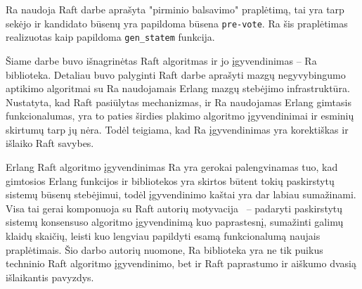 \documentclass{VUMIFPSkursinis}
\begin{document}
Ra  naudoja Raft darbe aprašyta "pirminio balsavimo" praplėtimą, tai yra tarp sekėjo ir kandidato būsenų yra papildoma būsena \texttt{pre-vote}. Ra šis praplėtimas realizuotas kaip papildoma \texttt{gen\_statem} funkcija.



Šiame darbe buvo išnagrinėtas Raft algoritmas ir jo įgyvendinimas -- Ra biblioteka. Detaliau buvo palyginti Raft darbe aprašyti mazgų negyvybingumo aptikimo algoritmai su Ra naudojamais Erlang mazgų stebėjimo infrastruktūra. Nustatyta, kad Raft pasiūlytas mechanizmas, ir Ra naudojamas Erlang gimtasis funkcionalumas, yra to paties širdies plakimo algoritmo įgyvendinimai ir esminių skirtumų tarp jų nėra. Todėl teigiama, kad Ra įgyvendinimas yra korektiškas ir išlaiko Raft savybes.

Erlang Raft algoritmo įgyvendinimas Ra yra gerokai palengvinamas tuo, kad gimtosios Erlang funkcijos ir bibliotekos yra skirtos būtent tokių paskirstytų sistemų būsenų stebėjimui, todėl įgyvendinimo kaštai yra dar labiau sumažinami. Visa tai gerai komponuoja su Raft autorių motyvacija~\cite{ongaro_consensus} -- padaryti paskirstytų sistemų konsensuso algoritmo įgyvendinimą kuo paprastesnį, sumažinti galimų klaidų skaičių, leisti kuo lengviau papildyti esamą funkcionalumą naujais praplėtimais. Šio darbo autorių nuomone, Ra biblioteka yra ne tik puikus techninio Raft algoritmo įgyvendinimo, bet ir Raft paprastumo ir aiškumo dvasią išlaikantis pavyzdys. 


\printbibliography[heading=bibintoc]  %


\appendix  %

\end{document}
